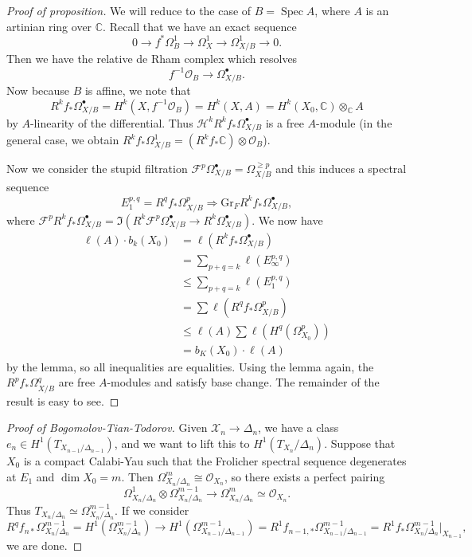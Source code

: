 \documentclass[leqno, openany]{memoir}
\theoremstyle{definition}
\theoremstyle{remark}
\theoremstyle{plain}
\theoremstyle{definition}
\theoremstyle{remark}
\newcommand{\C}{\mathbb{C}}
\newcommand{\mc}[1]{\mathcal{#1}}
\newcommand{\mr}[1]{\mathrm{#1}}
\DeclareMathOperator{\Spec}{Spec}
\begin{document}
\begin{proof}[Proof of proposition]
    We will reduce to the case of $B = \Spec A$, where $A$ is an artinian ring over $\C$. Recall that we have an exact sequence
    \[ 0 \to f^* \Omega^1_B \to \Omega^1_X \to \Omega^1_{X/B} \to 0. \]
    Then we have the relative de Rham complex which resolves
    \[ f^{-1} \mc{O}_B \to \Omega^{\bullet}_{X/B}. \]
    Now because $B$ is affine, we note that
    \[ R^k f_* \Omega^{\bullet}_{X/B} = H^k(X, f^{-1}\mc{O}_B) = H^k(X, A) = H^k(X_0, \C) \otimes_{\C} A \]
    by $A$-linearity of the differential. Thus $\mc{H}^k R^k f_* \Omega^{\bullet}_{X/B}$ is a free $A$-module (in the general case, we obtain $R^k f_* \Omega^1_{X/B} = (R^k f_* \C) \otimes \mc{O}_B$).

    Now we consider the stupid filtration $\mc{F}^p \Omega^{\bullet}_{X/B} = \Omega^{\geq p}_{X/B}$ and this induces a spectral sequence
    \[ E_1^{p,q} = R^q f_* \Omega^p_{X/B} \Rightarrow \mr{Gr}_F R^k f_* \Omega^{\bullet}_{X/B}, \]
    where $\mc{F}^p R^k f_* \Omega^{\bullet}_{X/B} = \Im (R^k \mc{F}^p \Omega^{\bullet}_{X/B} \to R^k \Omega^{\bullet}_{X/B})$. We now have
    \begin{align*} 
        \ell(A) \cdot b_k(X_0) &= \ell (R^k f_* \Omega^{\bullet}_{X/B}) \\
        &= \sum_{p+q=k} \ell(E_{\infty}^{p,q}) \\
        &\leq \sum_{p+q=k} \ell(E_1^{p,q})  \\
        &= \sum \ell(R^q f_* \Omega^p_{X/B}) \\
        &\leq \ell(A) \sum \ell(H^q(\Omega^p_{X_0})) \\
        &= b_K(X_0) \cdot \ell(A)
    \end{align*}
    by the lemma, so all inequalities are equalities. Using the lemma again, the $R^p f_* \Omega^q_{X/B}$ are free $A$-modules and satisfy base change. The remainder of the result is easy to see.
\end{proof}

\begin{proof}[Proof of Bogomolov-Tian-Todorov]
    Given $\mc{X}_n \to \Delta_n$, we have a class $e_n \in H^1(T_{X_{n-1}/\Delta_{n-1}})$, and we want to lift this to $H^1(T_{X_n} / \Delta_n)$. Suppose that $X_0$ is a compact Calabi-Yau such that the Frolicher spectral sequence degenerates at $E_1$ and $\dim X_0 = m$. Then $\Omega^m_{X_n/\Delta_n} \cong \mc{O}_{X_n}$, so there exists a perfect pairing
    \[ \Omega^1_{X_n/\Delta_n} \otimes \Omega^{m-1}_{X_n / \Delta_n} \to \Omega^m_{X_n / \Delta_n} \simeq \mc{O}_{X_n}. \]
    Thus $T_{X_n/\Delta_n} \simeq \Omega^{m-1}_{X_n/\Delta_n}$. If we consider
    \[ R^q f_{n*} \Omega^{m-1}_{X_n/\Delta_n} = H^1(\Omega^{m-1}_{X_n/\Delta_n}) \to H^1(\Omega^{m-1}_{X_{n-1}/\Delta_{n-1}}) = R^1 f_{n-1,*} \Omega^{m-1}_{X_{n-1}/\Delta_{n-1}} = R^1 f_* \Omega^{m-1}_{X_n/\Delta_n} |_{X_{n-1}}, \]
    we are done.
\end{proof}
\end{document}
